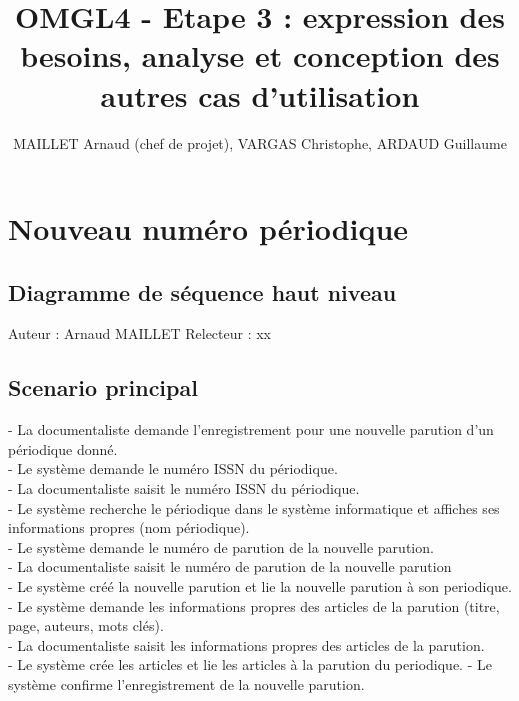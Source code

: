 \documentclass[a4paper,10pt]{report}
\title{OMGL4 - Etape 3 : expression des besoins, analyse et conception des autres cas d'utilisation}
\author{MAILLET Arnaud (chef de projet), VARGAS Christophe, ARDAUD Guillaume}
\begin{document}
\maketitle
\newpage
\null
\newpage
\tableofcontents
\newpage
\null
\newpage

\centering

\chapter*{Nouveau numéro périodique}
\section*{Diagramme de séquence haut niveau}

Auteur : Arnaud MAILLET
Relecteur : xx

\bigskip

\section*{Scenario principal}
\begin{flushleft}
- La documentaliste demande l'enregistrement pour une nouvelle parution d'un périodique donné.\\
- Le système demande le numéro ISSN du périodique.\\
- La documentaliste saisit le numéro ISSN du périodique.\\
- Le système recherche le périodique dans le système informatique et affiches ses informations propres (nom périodique).\\
- Le système demande le numéro de parution de la nouvelle parution.\\
- La documentaliste saisit le numéro de parution de la nouvelle parution\\
- Le système créé la nouvelle parution et lie la nouvelle parution à son periodique.\\
- Le système demande les informations propres des articles de la parution (titre, page, auteurs, mots clés).\\
- La documentaliste saisit les informations propres des articles de la parution.\\
- Le système crée les articles et lie les articles à la parution du periodique.
- Le système confirme l'enregistrement de la nouvelle parution.\\
\end{flushleft}
\end{document}
